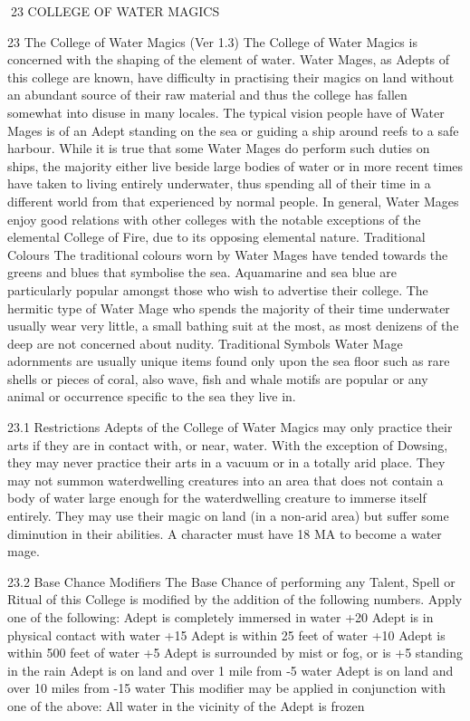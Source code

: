 \documentclass[a4paper]{article}
\begin{document}
\begin{multicols}{3}
23 COLLEGE OF WATER MAGICS

23 The College of Water Magics (Ver 1.3)
The College of Water Magics is concerned with the
shaping of the element of water. Water Mages, as
Adepts of this college are known, have difficulty in
practising their magics on land without an abundant source of their raw material and thus the college has fallen somewhat into disuse in many locales. The typical vision people have of Water
Mages is of an Adept standing on the sea or guiding a ship around reefs to a safe harbour. While it
is true that some Water Mages do perform such
duties on ships, the majority either live beside large
bodies of water or in more recent times have taken
to living entirely underwater, thus spending all of
their time in a different world from that experienced by normal people. In general, Water Mages
enjoy good relations with other colleges with the
notable exceptions of the elemental College of
Fire, due to its opposing elemental nature.
Traditional Colours
The traditional colours worn by Water Mages have
tended towards the greens and blues that symbolise
the sea. Aquamarine and sea blue are particularly
popular amongst those who wish to advertise their
college. The hermitic type of Water Mage who
spends the majority of their time underwater usually wear very little, a small bathing suit at the
most, as most denizens of the deep are not concerned about nudity.
Traditional Symbols
Water Mage adornments are usually unique items
found only upon the sea floor such as rare shells or
pieces of coral, also wave, fish and whale motifs
are popular or any animal or occurrence specific to
the sea they live in.

23.1 Restrictions
Adepts of the College of Water Magics may only
practice their arts if they are in contact with, or
near, water. With the exception of Dowsing, they
may never practice their arts in a vacuum or in a
totally arid place. They may not summon waterdwelling creatures into an area that does not contain a body of water large enough for the waterdwelling creature to immerse itself entirely. They
may use their magic on land (in a non-arid area)
but suffer some diminution in their abilities. A
character must have 18 MA to become a water
mage.

23.2 Base Chance Modifiers
The Base Chance of performing any Talent, Spell
or Ritual of this College is modified by the addition of the following numbers. Apply one of the
following:
Adept is completely immersed in water
+20
Adept is in physical contact with water
+15
Adept is within 25 feet of water
+10
Adept is within 500 feet of water
+5
Adept is surrounded by mist or fog, or is
+5
standing in the rain
Adept is on land and over 1 mile from
-5
water
Adept is on land and over 10 miles from
-15
water
This modifier may be applied in conjunction with
one of the above:
All water in the vicinity of the Adept is
frozen


\end{multicols}
\end{document}
